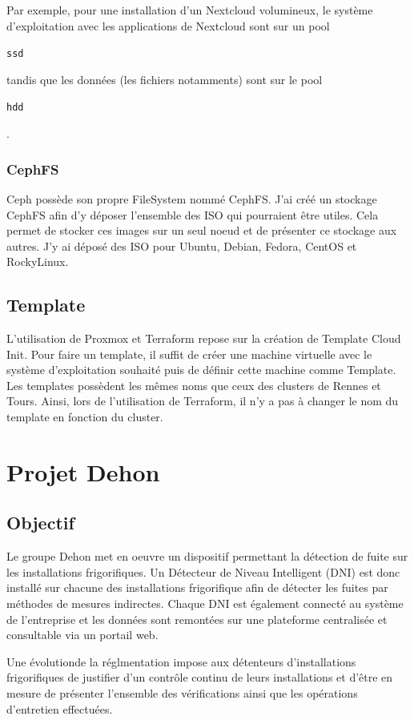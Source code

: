 \documentclass[12pt, a4paper, twoside]{article}
\begin{document}
Par exemple, pour une installation d'un \gls{Nextcloud} volumineux, le système d'exploitation avec les applications de \gls{Nextcloud} sont sur un pool \begin{code}\texttt{ssd}\end{code} tandis que les données (les fichiers notamments) sont sur le pool \begin{code}\texttt{hdd}\end{code}.

\subsubsection{CephFS}
\gls{Ceph} possède son propre \gls{FileSystem} nommé CephFS.
J'ai créé un stockage CephFS afin d'y déposer l'ensemble des \gls{ISO} qui pourraient être utiles.
Cela permet de stocker ces images sur un seul noeud et de présenter ce stockage aux autres.
J'y ai déposé des \gls{ISO} pour Ubuntu, Debian, Fedora, CentOS et RockyLinux.

\subsection{Template}
L'utilisation de \gls{Proxmox} et \gls{Terraform} repose sur la création de Template Cloud Init.
Pour faire un template, il suffit de créer une machine virtuelle avec le système d'exploitation souhaité puis de définir cette machine comme Template.
Les templates possèdent les mêmes noms que ceux des clusters de Rennes et Tours.
Ainsi, lors de l'utilisation de Terraform, il n'y a pas à changer le nom du template en fonction du cluster.

\newpage
\section{Projet Dehon} \label{dehon}
\subsection{Objectif}
Le groupe Dehon met en oeuvre un dispositif permettant la détection de fuite sur les installations frigorifiques. 
Un Détecteur de Niveau Intelligent (\gls{DNI}) est donc installé sur chacune des installations frigorifique afin de détecter les fuites par méthodes de mesures indirectes.
Chaque DNI est également connecté au système de l'entreprise et les données sont remontées sur une plateforme centralisée et consultable via un portail web. 

Une évolutionde la réglmentation impose aux détenteurs d'installations frigorifiques de justifier d'un contrôle continu de leurs installations et d'être en mesure de présenter l'ensemble des vérifications ainsi que les opérations d'entretien effectuées.
\end{document}
